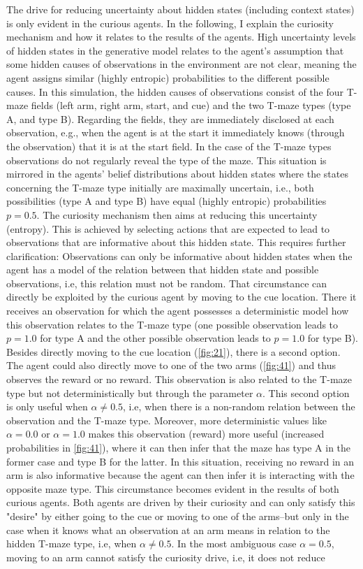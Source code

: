 The drive for reducing uncertainty about hidden states (including context states) is only evident in the curious agents. In the following, I explain the curiosity mechanism and how it relates to the results of the agents. High uncertainty levels of hidden states in the generative model relates to the agent's assumption that some hidden causes of observations in the environment are not clear, meaning the agent assigns similar (highly entropic) probabilities to the different possible causes. In this simulation, the hidden causes of observations consist of the four T-maze fields (left arm, right arm, start, and cue) and the two T-maze types (type A, and type B). Regarding the fields, they are immediately disclosed at each observation, e.g., when the agent is at the start it immediately knows (through the observation) that it is at the start field. In the case of the T-maze types observations do not regularly reveal the type of the maze. This situation is mirrored in the agents' belief distributions about hidden states where the states concerning the T-maze type initially are maximally uncertain, i.e., both possibilities (type A and type B) have equal (highly entropic) probabilities \(p=0.5\). The curiosity mechanism then aims at reducing this uncertainty (entropy). This is achieved by selecting actions that are expected to lead to observations that are informative about this hidden state. This requires further clarification: Observations can only be informative about hidden states when the agent has a model of the relation between that hidden state and possible observations, i.e, this relation must not be random. That circumstance can directly be exploited by the curious agent by moving to the cue location. There it receives an observation for which the agent possesses a deterministic model how this observation relates to the T-maze type (one possible observation leads to \(p=1.0\) for type A and the other possible observation leads to \(p=1.0\) for type B). Besides directly moving to the cue location (\cref{fig:21}), there is a second option. The agent could also directly move to one of the two arms (\cref{fig:41}) and thus observes the reward or no reward. This observation is also related to the T-maze type but not deterministically but through the parameter \(\alpha\). This second option is only useful when \(\alpha \neq 0.5\), i.e, when there is a non-random relation between the observation and the T-maze type. Moreover, more deterministic values like \(\alpha=0.0\) or \(\alpha=1.0\) makes this observation (reward) more useful (increased probabilities in \cref{fig:41}), where it can then infer that the maze has type A in the former case and type B for the latter. In this situation, receiving no reward in an arm is also informative because the agent can then infer it is interacting with the opposite maze type. This circumstance becomes evident in the results of both curious agents. Both agents are driven by their curiosity and can only satisfy this "desire" by either going to the cue or moving to one of the arms--but only in the case when it knows what an observation at an arm means in relation to the hidden T-maze type, i.e, when \(\alpha \neq 0.5\). In the most ambiguous case \(\alpha=0.5\), moving to an arm cannot satisfy the curiosity drive, i.e, it does not reduce 